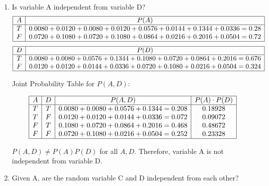 \documentclass[12pt]{article}
\begin{document}
\begin{enumerate}[font=\Large,label=(\alph*)]
	\item Is variable A independent from variable D?
	      $$
		      \begin{array}{|c|c|}
			      \hline
			      A & P(A)                                                         \\
			      \hline
			      T & 0.0080+0.0120+0.0080+0.0120+0.0576+0.0144+0.1344+0.0336=0.28 \\
			      F & 0.0720+0.1080+0.0720+0.1080+0.0864+0.0216+0.2016+0.0504=0.72 \\
			      \hline
		      \end{array}
	      $$
	      $$
		      \begin{array}{|c|c|}
			      \hline
			      D & P(D)                                                          \\
			      \hline
			      T & 0.0080+0.0080+0.0576+0.1344+0.1080+0.0720+0.0864+0.2016=0.676 \\
			      F & 0.0120+0.0120+0.0144+0.0336+0.0720+0.1080+0.0216+0.0504=0.324 \\
			      \hline
		      \end{array}
	      $$

	      Joint Probability Table for $ P(A, D) $:

	      $$
		      \begin{array}{|c|c|c|c|}
			      \hline
			      A & D & P(A, D)                           & P(A)\cdot P(D) \\
			      \hline
			      T & T & 0.0080+0.0080+0.0576+0.1344=0.208 & 0.18928        \\
			      T & F & 0.0120+0.0120+0.0144+0.0336=0.072 & 0.09072        \\
			      F & T & 0.1080+0.0720+0.0864+0.2016=0.468 & 0.48672        \\
			      F & F & 0.0720+0.1080+0.0216+0.0504=0.252 & 0.23328        \\
			      \hline
		      \end{array}
	      $$

	      $ P(A, D) \neq P(A) P(D) $ for all $A,D$. Therefore, variable A is not independent from variable D.

	\item Given A, are the random variable C and D independent from each other?


\end{enumerate}
\end{document}
